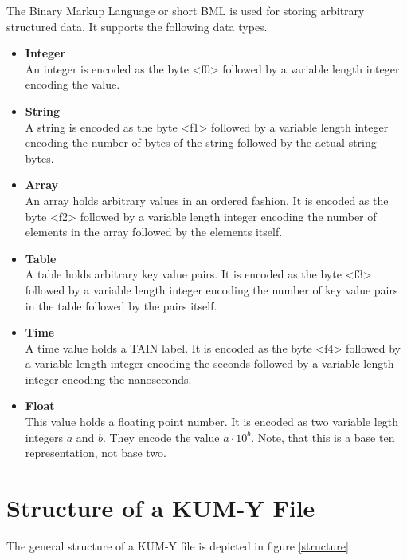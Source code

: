\documentclass[DIV=10]{scrartcl}
\begin{document}
The Binary Markup Language or short BML is used for storing arbitrary structured data.
It supports the following data types.

\begin{itemize}
\item \textbf{Integer}\\
An integer is encoded as the byte <f0> followed by a variable length integer encoding the value.

\item \textbf{String}\\
A string is encoded as the byte <f1> followed by a variable length integer encoding the number of bytes of the string followed by the actual string bytes.

\item \textbf{Array}\\
An array holds arbitrary values in an ordered fashion.
It is encoded as the byte <f2> followed by a variable length integer encoding the number of elements in the array followed by the elements itself.

\item \textbf{Table}\\
A table holds arbitrary key value pairs.
It is encoded as the byte <f3> followed by a variable length integer encoding the number of key value pairs in the table followed by the pairs itself.

\item \textbf{Time}\\
A time value holds a TAIN label.
It is encoded as the byte <f4> followed by a variable length integer encoding the seconds followed by a variable length integer encoding the nanoseconds.

\item \textbf{Float}\\
This value holds a floating point number.
It is encoded as two variable legth integers \(a\) and \(b\).
They encode the value \(a\cdot10^b\).
Note, that this is a base ten representation, not base two.
\end{itemize}

\clearpage

\section{Structure of a KUM-Y File}

The general structure of a KUM-Y file is depicted in figure \ref{structure}.
\end{document}
